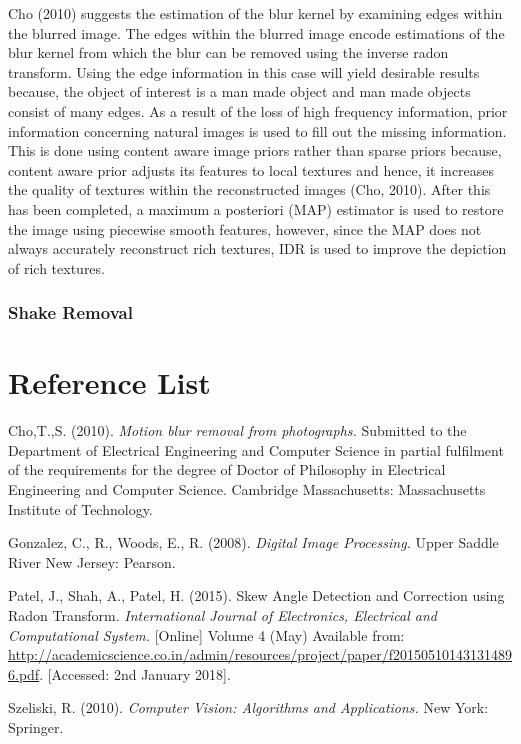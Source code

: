 \documentclass[a4paper, 16pt]{article}
\begin{document}
Cho (2010) suggests the estimation of the blur kernel by examining edges within the blurred image. The edges within the blurred image encode estimations of the blur kernel from which the blur can be removed using the inverse radon transform. Using the edge information in this case will yield desirable results because, the object of interest is a man made object and man made objects consist of many edges. As a result of the loss of high frequency information, prior information concerning natural images is used to fill out the missing information. This is done using content aware image priors rather than sparse priors because, content aware prior adjusts its features to local textures and hence, it increases the quality of textures within the reconstructed images (Cho, 2010). After this has been completed, a maximum a posteriori (MAP) estimator is used to restore the image using piecewise smooth features, however, since the MAP does not always accurately reconstruct rich textures, IDR is used to improve the depiction of rich textures. 

\subsubsection{Shake Removal}

\newpage

\section{Reference List} 

Cho,T.,S. (2010). \textit{Motion blur removal from photographs.} Submitted to the Department of Electrical Engineering and Computer Science in partial fulfilment of the requirements for the degree of Doctor of Philosophy in Electrical Engineering and Computer Science. Cambridge Massachusetts: Massachusetts Institute of Technology.
\parskip 0.2in 

Gonzalez, C., R., Woods, E., R. (2008). \textit{Digital Image Processing.} Upper Saddle River New Jersey: Pearson.
\parskip 0.2in

Patel, J., Shah, A., Patel, H. (2015). Skew Angle Detection and Correction using Radon Transform. \textit{International Journal of Electronics, Electrical and Computational System.} [Online] Volume 4 (May) Available from: \url{http://academicscience.co.in/admin/resources/project/paper/f201505101431314896.pdf}. [Accessed: 2nd January 2018].
\parskip 0.2in

Szeliski, R. (2010). \textit{Computer Vision: Algorithms and Applications.} New York: Springer.
\parskip 0.2in
\end{document}
